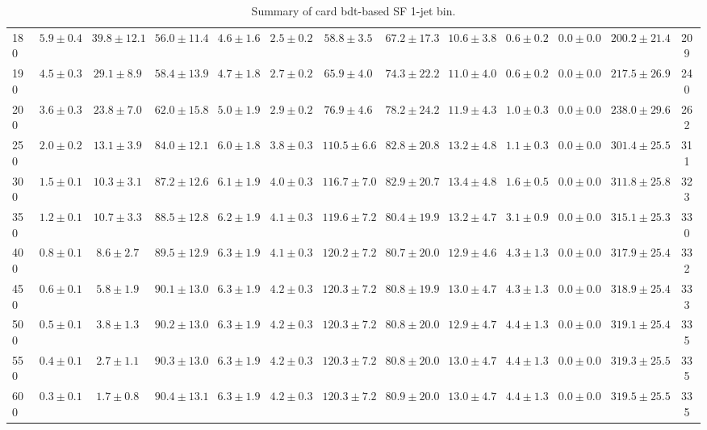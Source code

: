 \begin{table}
{\begin{center}
\begin{tabular}{l | c c | c c c c c c c c  | c c}
180 & $5.9\pm0.4$ & $39.8\pm12.1$ & $56.0\pm11.4$ & $4.6\pm1.6$ & $2.5\pm0.2$ & $58.8\pm3.5$ & $67.2\pm17.3$ & $10.6\pm3.8$ & $0.6\pm0.2$ & $0.0\pm0.0$ & $200.2\pm21.4$ & 209 \\
190 & $4.5\pm0.3$ & $29.1\pm8.9$ & $58.4\pm13.9$ & $4.7\pm1.8$ & $2.7\pm0.2$ & $65.9\pm4.0$ & $74.3\pm22.2$ & $11.0\pm4.0$ & $0.6\pm0.2$ & $0.0\pm0.0$ & $217.5\pm26.9$ & 240 \\
200 & $3.6\pm0.3$ & $23.8\pm7.0$ & $62.0\pm15.8$ & $5.0\pm1.9$ & $2.9\pm0.2$ & $76.9\pm4.6$ & $78.2\pm24.2$ & $11.9\pm4.3$ & $1.0\pm0.3$ & $0.0\pm0.0$ & $238.0\pm29.6$ & 262 \\
250 & $2.0\pm0.2$ & $13.1\pm3.9$ & $84.0\pm12.1$ & $6.0\pm1.8$ & $3.8\pm0.3$ & $110.5\pm6.6$ & $82.8\pm20.8$ & $13.2\pm4.8$ & $1.1\pm0.3$ & $0.0\pm0.0$ & $301.4\pm25.5$ & 311 \\
300 & $1.5\pm0.1$ & $10.3\pm3.1$ & $87.2\pm12.6$ & $6.1\pm1.9$ & $4.0\pm0.3$ & $116.7\pm7.0$ & $82.9\pm20.7$ & $13.4\pm4.8$ & $1.6\pm0.5$ & $0.0\pm0.0$ & $311.8\pm25.8$ & 323 \\
350 & $1.2\pm0.1$ & $10.7\pm3.3$ & $88.5\pm12.8$ & $6.2\pm1.9$ & $4.1\pm0.3$ & $119.6\pm7.2$ & $80.4\pm19.9$ & $13.2\pm4.7$ & $3.1\pm0.9$ & $0.0\pm0.0$ & $315.1\pm25.3$ & 330 \\
400 & $0.8\pm0.1$ & $8.6\pm2.7$ & $89.5\pm12.9$ & $6.3\pm1.9$ & $4.1\pm0.3$ & $120.2\pm7.2$ & $80.7\pm20.0$ & $12.9\pm4.6$ & $4.3\pm1.3$ & $0.0\pm0.0$ & $317.9\pm25.4$ & 332 \\
450 & $0.6\pm0.1$ & $5.8\pm1.9$ & $90.1\pm13.0$ & $6.3\pm1.9$ & $4.2\pm0.3$ & $120.3\pm7.2$ & $80.8\pm19.9$ & $13.0\pm4.7$ & $4.3\pm1.3$ & $0.0\pm0.0$ & $318.9\pm25.4$ & 333 \\
500 & $0.5\pm0.1$ & $3.8\pm1.3$ & $90.2\pm13.0$ & $6.3\pm1.9$ & $4.2\pm0.3$ & $120.3\pm7.2$ & $80.8\pm20.0$ & $12.9\pm4.7$ & $4.4\pm1.3$ & $0.0\pm0.0$ & $319.1\pm25.4$ & 335 \\
550 & $0.4\pm0.1$ & $2.7\pm1.1$ & $90.3\pm13.0$ & $6.3\pm1.9$ & $4.2\pm0.3$ & $120.3\pm7.2$ & $80.8\pm20.0$ & $13.0\pm4.7$ & $4.4\pm1.3$ & $0.0\pm0.0$ & $319.3\pm25.5$ & 335 \\
600 & $0.3\pm0.1$ & $1.7\pm0.8$ & $90.4\pm13.1$ & $6.3\pm1.9$ & $4.2\pm0.3$ & $120.3\pm7.2$ & $80.9\pm20.0$ & $13.0\pm4.7$ & $4.4\pm1.3$ & $0.0\pm0.0$ & $319.5\pm25.5$ & 335 \\
\hline
\end{tabular}
\end{center}
}
\caption{Summary of card bdt-based SF 1-jet bin.}
\end{table}


